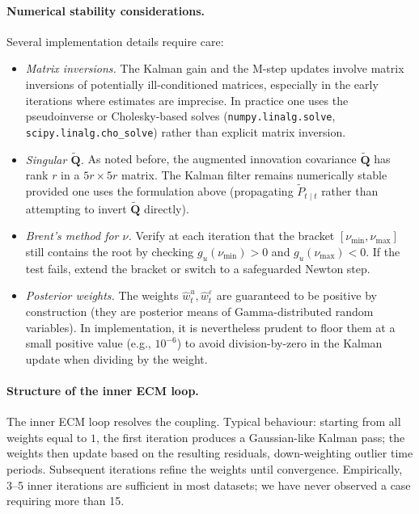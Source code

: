 \documentclass[11pt, a4paper, oneside]{article}
\begin{document}
\paragraph{Numerical stability considerations.}
Several implementation details require care:
\begin{itemize}[leftmargin=1.5em, itemsep=3pt]
    \item \emph{Matrix inversions.} The Kalman gain and the M-step
          updates involve matrix inversions of potentially ill-conditioned
          matrices, especially in the early iterations where estimates
          are imprecise. In practice one uses the pseudoinverse or
          Cholesky-based solves (\texttt{numpy.linalg.solve},
          \texttt{scipy.linalg.cho\_solve}) rather than explicit
          matrix inversion.
    \item \emph{Singular $\tilde{\mathbf{Q}}$.} As noted before, the augmented innovation
          covariance $\tilde{\mathbf{Q}}$ has rank $r$ in a $5r \times 5r$
          matrix. The Kalman filter remains numerically stable provided
          one uses the formulation above (propagating
          $\tilde{P}_{t \mid t}$ rather than attempting to invert
          $\tilde{\mathbf{Q}}$ directly).
    \item \emph{Brent's method for $\nu$.} Verify at each iteration
          that the bracket $[\nu_{\min}, \nu_{\max}]$ still contains
          the root by checking $g_u(\nu_{\min}) > 0$ and
          $g_u(\nu_{\max}) < 0$. If the test fails, extend the bracket
          or switch to a safeguarded Newton step.
    \item \emph{Posterior weights.} The weights $\hat{w}^u_t, \hat{w}^\varepsilon_t$ are guaranteed to be positive by
          construction (they are posterior means of Gamma-distributed
          random variables). In implementation, it is nevertheless
          prudent to floor them at a small positive value (e.g.,
          $10^{-6}$) to avoid division-by-zero in the Kalman update
          when dividing by the weight.
\end{itemize}

\paragraph{Structure of the inner ECM loop.}
The inner ECM loop resolves the coupling. Typical behaviour: starting from all
weights equal to $1$, the first iteration produces a Gaussian-like
Kalman pass; the weights then update based on the resulting
residuals, down-weighting outlier time periods. Subsequent iterations
refine the weights until convergence. Empirically, 3–5 inner
iterations are sufficient in most datasets; we have never observed a
case requiring more than 15.
\end{document}
